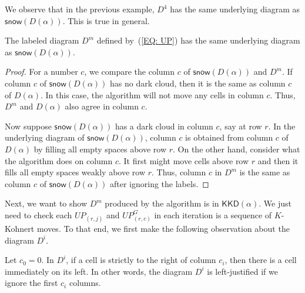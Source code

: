 \documentclass[ALCO]{cedram}
\newcommand{\KKD}{\mathsf{KKD}}
\newcommand{\snow}{\mathsf{snow}}
\begin{document}
We observe that in the previous example, 
$D^4$ has the same underlying diagram as $\snow(D(\alpha))$.
This is true in general.

\begin{lem}
The labeled diagram $D^m$ defined by~(\ref{EQ: UP})
has the same underlying diagram as $\snow(D(\alpha))$.
\end{lem}
\begin{proof}
For a number $c$, 
we compare the column $c$ 
of $\snow(D(\alpha))$ and $D^m$.
If column $c$ of $\snow(D(\alpha))$ has no dark cloud,
then it is the same as column $c$ of $D(\alpha)$.
In this case, the algorithm will not move any cells 
in column $c$.
Thus, $D^m$ and $D(\alpha)$ also agree in column $c$.

Now suppose $\snow(D(\alpha))$ has a dark cloud
in column $c$, say at row $r$.
In the underlying diagram of $\snow(D(\alpha))$,
column $c$ is obtained from column $c$ of $D(\alpha)$ 
by filling all empty spaces above row $r$.  
On the other hand, consider what the algorithm does on column $c$.
It first might move cells above row $r$
and then it fills all empty spaces weakly above row $r$.
Thus, column $c$ in $D^m$ is the same as 
column $c$ of $\snow(D(\alpha))$ after ignoring the labels.  
\end{proof}

Next, we want to show $D^m$ produced by the algorithm
is in $\KKD(\alpha)$.
We just need to check each $UP_{(r,j)}$ and $UP^G_{(r,c)}$ in each iteration is a sequence of $K$-Kohnert moves. To that end, we first make the following observation about the diagram $D^i$.

\begin{lemma}
Let $c_0 = 0$. In $D^i$,
if a cell is strictly to the right of column $c_i$,
then there is a cell immediately on its left.
In other words, 
the diagram $D^i$ is left-justified if we ignore the first $c_i$ columns.
\end{lemma}
\end{document}

